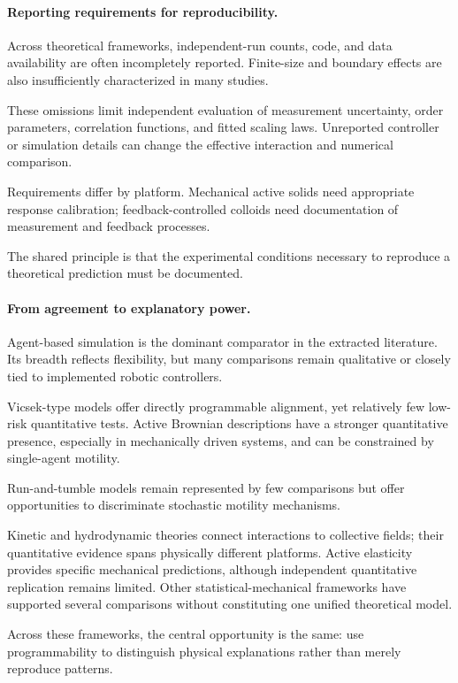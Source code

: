 \paragraph*{Reporting requirements for reproducibility.}

Across theoretical frameworks,
independent-run counts, code,
and data availability are
often incompletely reported.
Finite-size and boundary
effects are also insufficiently
characterized in many studies.

These omissions limit independent
evaluation of measurement uncertainty,
order parameters, correlation functions,
and fitted scaling laws.
Unreported controller or simulation
details can change the effective
interaction and numerical comparison.

Requirements differ by platform.
Mechanical active solids need
appropriate response calibration;
feedback-controlled colloids need
documentation of measurement and
feedback processes.

The shared principle is that
the experimental conditions
necessary to reproduce a
theoretical prediction must
be documented.

\paragraph*{From agreement to explanatory power.}

Agent-based simulation is the
dominant comparator in the
extracted literature. Its breadth
reflects flexibility, but many
comparisons remain qualitative
or closely tied to implemented
robotic controllers.

Vicsek-type models offer directly
programmable alignment, yet relatively
few low-risk quantitative tests.
Active Brownian descriptions have
a stronger quantitative presence,
especially in mechanically driven
systems, and can be constrained
by single-agent motility.

Run-and-tumble models remain
represented by few comparisons
but offer opportunities to
discriminate stochastic
motility mechanisms.

Kinetic and hydrodynamic theories
connect interactions to collective
fields; their quantitative evidence
spans physically different platforms.
Active elasticity provides
specific mechanical predictions,
although independent quantitative
replication remains limited.
Other statistical-mechanical
frameworks have supported several
comparisons without constituting
one unified theoretical model.

Across these frameworks, the
central opportunity is the same:
use programmability to distinguish
physical explanations rather
than merely reproduce patterns.

